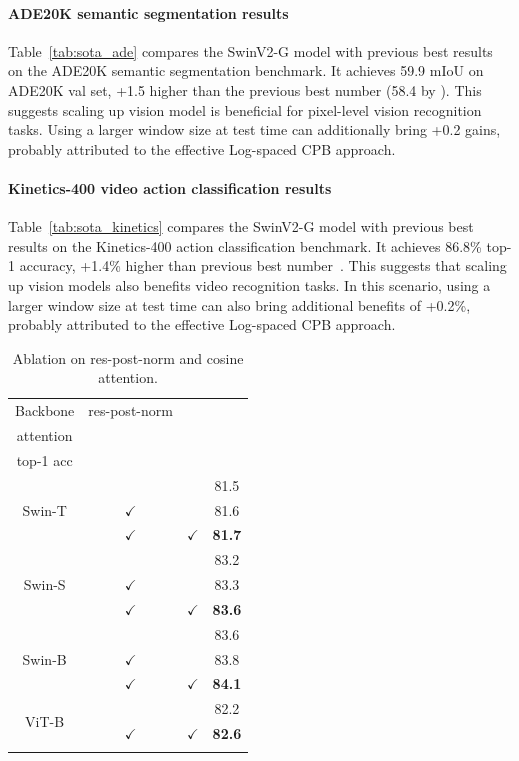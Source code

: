 \documentclass[10pt,twocolumn,letterpaper]{article}
\begin{document}
\paragraph{ADE20K semantic segmentation results}

Table~\ref{tab:sota_ade} compares the SwinV2-G model with previous best results on the ADE20K semantic segmentation benchmark. It achieves 59.9 mIoU on ADE20K val set, +1.5 higher than the previous best number (58.4 by \cite{bao2021beit}). This suggests scaling up vision model is beneficial for pixel-level vision recognition tasks. Using a larger window size at test time can additionally bring +0.2 gains, probably attributed to the effective Log-spaced CPB approach.

\vspace{-0.5em}

\paragraph{Kinetics-400 video action classification results}

Table~\ref{tab:sota_kinetics} compares the SwinV2-G model with previous best results on the Kinetics-400 action classification benchmark. It achieves 86.8\% top-1 accuracy, +1.4\% higher than previous best number~\cite{ryoo2021tokenlearner}. This suggests that scaling up vision models also benefits video recognition tasks. In this scenario, using a larger window size at test time can also bring additional benefits of +0.2\%, probably attributed to the effective Log-spaced CPB approach.


\begin{table}[t]
    \centering
    \small
    \begin{tabular}{c|c|c|c}
    \Xhline{1.0pt}
    Backbone & res-post-norm & \makecell{scaled cosine\\attention} & \makecell{ImageNet \\ top-1 acc} \\
    \hline
    \multirow{3}{*}{Swin-T} & & & 81.5 \\
    & $\checkmark$ & & 81.6\\
    & $\checkmark$ & $\checkmark$ & \textbf{81.7} \\
    \hline
    \multirow{3}{*}{Swin-S} & & &83.2 \\
    & $\checkmark$ & & 83.3\\
    & $\checkmark$ & $\checkmark$ & \textbf{83.6} \\
    \hline
    \multirow{3}{*}{Swin-B} & & &83.6 \\
    & $\checkmark$ & & 83.8\\
    & $\checkmark$ & $\checkmark$ & \textbf{84.1} \\  
     \hline
     \hline
    \multirow{2}{*}{ViT-B} & & &82.2 \\
    & $\checkmark$ & $\checkmark$ & \textbf{82.6} \\ 
    \Xhline{1.0pt}
    \end{tabular}
    \caption{Ablation on res-post-norm and cosine attention.}
    \label{tab:postnorm_cosatt}
    \vspace{-1em}
\end{table}
\end{document}
